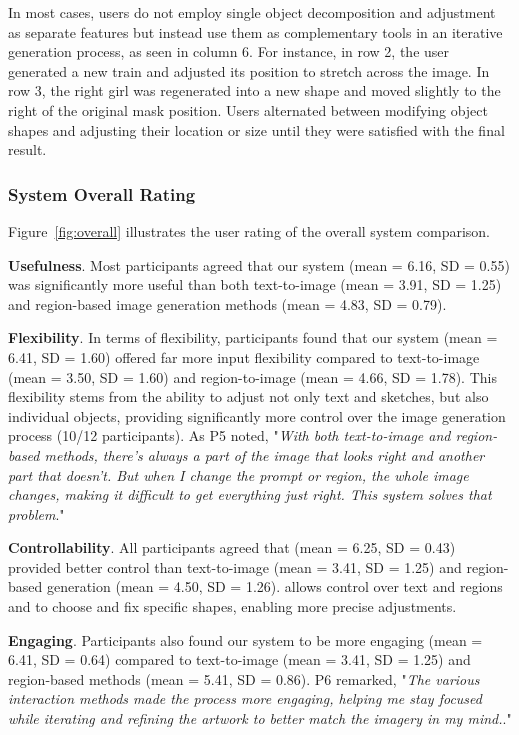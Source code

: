 In most cases, users do not employ single object decomposition and adjustment as separate features but instead use them as complementary tools in an iterative generation process, as seen in column 6. 
For instance, in row 2, the user generated a new train and adjusted its position to stretch across the image. 
In row 3, the right girl was regenerated into a new shape and moved slightly to the right of the original mask position. 
Users alternated between modifying object shapes and adjusting their location or size until they were satisfied with the final result.

\subsubsection{System Overall Rating}\label{ssec:overallrating}

Figure~\ref{fig:overall} illustrates the user rating of the overall system comparison.

\textbf{Usefulness}. Most participants agreed that our system (mean = 6.16, SD = 0.55) was significantly more useful than both text-to-image (mean = 3.91, SD = 1.25) and region-based image generation methods (mean = 4.83, SD = 0.79).

\textbf{Flexibility}. In terms of flexibility, participants found that our system (mean = 6.41, SD = 1.60) offered far more input flexibility compared to text-to-image (mean = 3.50, SD = 1.60) and region-to-image (mean = 4.66, SD = 1.78). This flexibility stems from the ability to adjust not only text and sketches, but also individual objects, providing significantly more control over the image generation process (10/12 participants). As P5 noted, "\emph{With both text-to-image and region-based methods, there's always a part of the image that looks right and another part that doesn’t. But when I change the prompt or region, the whole image changes, making it difficult to get everything just right. This system solves that problem}."

\textbf{Controllability}. All participants agreed that \tool (mean = 6.25, SD = 0.43) provided better control than text-to-image (mean = 3.41, SD = 1.25) and region-based generation (mean = 4.50, SD = 1.26). 
\tool allows control over text and regions and to choose and fix specific shapes, enabling more precise adjustments.

\textbf{Engaging}. Participants also found our system to be more engaging (mean = 6.41, SD = 0.64) compared to text-to-image (mean = 3.41, SD = 1.25) and region-based methods (mean = 5.41, SD = 0.86). P6 remarked, "\emph{The various interaction methods made the process more engaging, helping me stay focused while iterating and refining the artwork to better match the imagery in my mind.}."

